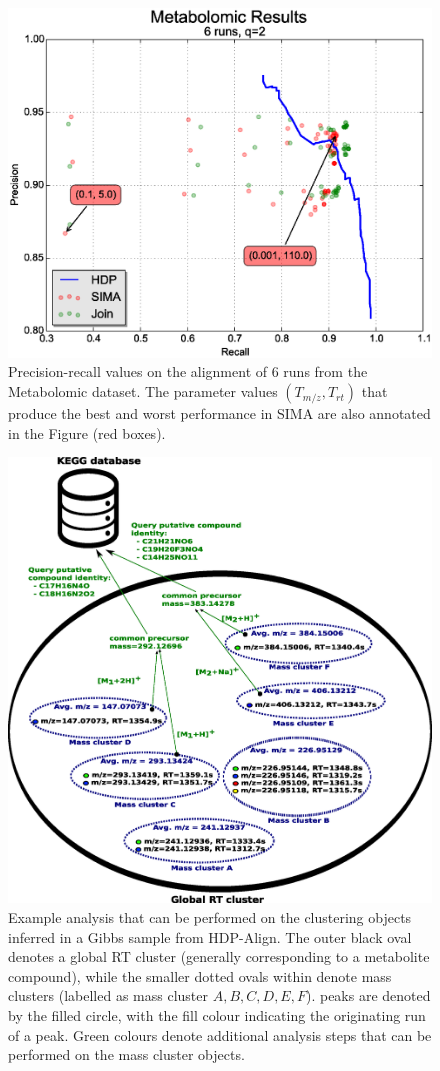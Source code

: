 \begin{figure}[!htbp]
\centering\includegraphics[width=0.7\linewidth]{06-hdp/figures/figure_6.eps}
\centering\caption{\label{fig:metabolomic_results_alignment}Precision-recall values on the alignment of 6 runs from the Metabolomic dataset. The parameter values $(T_{m/z}, T_{rt})$ that produce the best and worst performance in SIMA are also annotated in the Figure (red boxes).}
\end{figure}

\begin{figure}[!htbp]
\centering\includegraphics[width=0.7\linewidth]{06-hdp/figures/figure_7.eps}
\centering\caption[Example analysis that can be performed on the clustering objects inferred in a Gibbs sample from HDP-Align.]{\label{fig:metabolomic_results_annotations}Example analysis that can be performed on the clustering objects inferred in a Gibbs sample from HDP-Align. The outer black oval denotes a global RT cluster (generally corresponding to a metabolite compound), while the smaller dotted ovals within denote mass clusters (labelled as mass cluster $A,B,C,D,E,F$). peaks are denoted by the filled circle, with the fill colour indicating the originating run of a peak. Green colours denote additional analysis steps that can be performed on the mass cluster objects.}
\end{figure}

